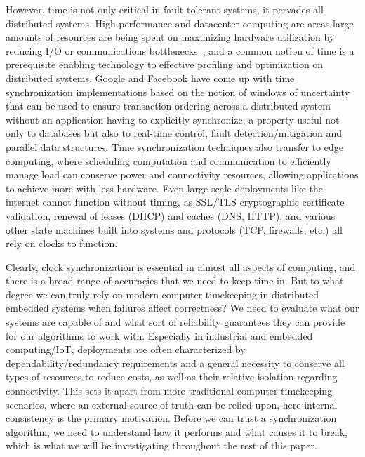 However, time is not only critical in fault-tolerant systems, it pervades all distributed systems.
High-performance and datacenter computing are areas large amounts of resources are being spent on maximizing hardware utilization by reducing I/O or communications bottlenecks~\cite{hpc-understanding-bottlenecks, hpc-solving-io-bottleneck, hpc-diagnosing-io-bottlenecks}, and a common notion of time is a prerequisite enabling technology to effective profiling and optimization on distributed systems.
Google and Facebook have come up with time synchronization implementations based on the notion of windows of uncertainty that can be used to ensure transaction ordering across a distributed system without an application having to explicitly synchronize, a property useful not only to databases but also to real-time control, fault detection/mitigation and parallel data structures.
Time synchronization techniques also transfer to edge computing, where scheduling computation and communication to efficiently manage load can conserve power and connectivity resources, allowing applications to achieve more with less hardware.
Even large scale deployments like the internet cannot function without timing, as SSL/TLS cryptographic certificate validation, renewal of leases (DHCP) and caches (DNS, HTTP), and various other state machines built into systems and protocols (TCP, firewalls, etc.) all rely on clocks to function.

Clearly, clock synchronization is essential in almost all aspects of computing, and there is a broad range of accuracies that we need to keep time in. But to what degree we can truly rely on modern computer timekeeping in distributed embedded systems when failures affect correctness?
We need to evaluate what our systems are capable of and what sort of reliability guarantees they can provide for our algorithms to work with.
Especially in industrial and embedded computing/IoT, deployments are often characterized by dependability/redundancy requirements and a general necessity to conserve all types of resources to reduce costs, as well as their relative isolation regarding connectivity.
This sets it apart from more traditional computer timekeeping scenarios, where an external source of truth can be relied upon, here internal consistency is the primary motivation.
Before we can trust a synchronization algorithm, we need to understand how it performs and what causes it to break, which is what we will be investigating throughout the rest of this paper.


